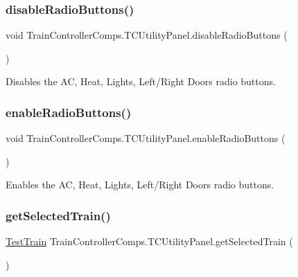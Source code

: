 \subsubsection{\texorpdfstring{disable\+Radio\+Buttons()}{disableRadioButtons()}}
{\footnotesize\ttfamily void Train\+Controller\+Comps.\+T\+C\+Utility\+Panel.\+disable\+Radio\+Buttons (\begin{DoxyParamCaption}{ }\end{DoxyParamCaption})\hspace{0.3cm}{\ttfamily [private]}}



Disables the AC, Heat, Lights, Left/\+Right Doors radio buttons. 

\mbox{\label{classTrainControllerComps_1_1TCUtilityPanel_ae698554e95819802e78e7159d7319d98}} 
\subsubsection{\texorpdfstring{enable\+Radio\+Buttons()}{enableRadioButtons()}}
{\footnotesize\ttfamily void Train\+Controller\+Comps.\+T\+C\+Utility\+Panel.\+enable\+Radio\+Buttons (\begin{DoxyParamCaption}{ }\end{DoxyParamCaption})\hspace{0.3cm}{\ttfamily [private]}}



Enables the AC, Heat, Lights, Left/\+Right Doors radio buttons. 

\mbox{\label{classTrainControllerComps_1_1TCUtilityPanel_aa79861090681f39d2e15d9f35cc19114}} 
\subsubsection{\texorpdfstring{get\+Selected\+Train()}{getSelectedTrain()}}
{\footnotesize\ttfamily \hyperlink{classTrainControllerComps_1_1TestTrain}{Test\+Train} Train\+Controller\+Comps.\+T\+C\+Utility\+Panel.\+get\+Selected\+Train (\begin{DoxyParamCaption}{ }\end{DoxyParamCaption})}




